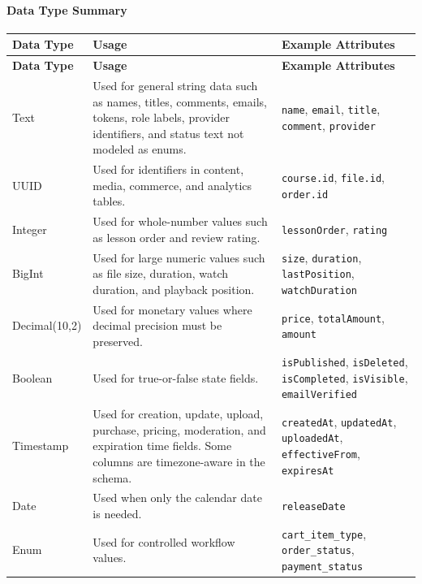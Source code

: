 \paragraph{Data Type Summary}
\begin{longtable}{L{2.5cm}L{7.1cm}L{4.1cm}}
\toprule
\textbf{Data Type} & \textbf{Usage} & \textbf{Example Attributes} \\
\midrule
\endfirsthead
\toprule
\textbf{Data Type} & \textbf{Usage} & \textbf{Example Attributes} \\
\midrule
\endhead
\bottomrule
\endfoot
Text & Used for general string data such as names, titles, comments, emails, tokens, role labels, provider identifiers, and status text not modeled as enums. & \texttt{name}, \texttt{email}, \texttt{title}, \texttt{comment}, \texttt{provider} \\
UUID & Used for identifiers in content, media, commerce, and analytics tables. & \texttt{course.id}, \texttt{file.id}, \texttt{order.id} \\
Integer & Used for whole-number values such as lesson order and review rating. & \texttt{lessonOrder}, \texttt{rating} \\
BigInt & Used for large numeric values such as file size, duration, watch duration, and playback position. & \texttt{size}, \texttt{duration}, \texttt{lastPosition}, \texttt{watchDuration} \\
Decimal(10,2) & Used for monetary values where decimal precision must be preserved. & \texttt{price}, \texttt{totalAmount}, \texttt{amount} \\
Boolean & Used for true-or-false state fields. & \texttt{isPublished}, \texttt{isDeleted}, \texttt{isCompleted}, \texttt{isVisible}, \texttt{emailVerified} \\
Timestamp & Used for creation, update, upload, purchase, pricing, moderation, and expiration time fields. Some columns are timezone-aware in the schema. & \texttt{createdAt}, \texttt{updatedAt}, \texttt{uploadedAt}, \texttt{effectiveFrom}, \texttt{expiresAt} \\
Date & Used when only the calendar date is needed. & \texttt{releaseDate} \\
Enum & Used for controlled workflow values. & \texttt{cart\_item\_type}, \texttt{order\_status}, \texttt{payment\_status} \\
\end{longtable}

